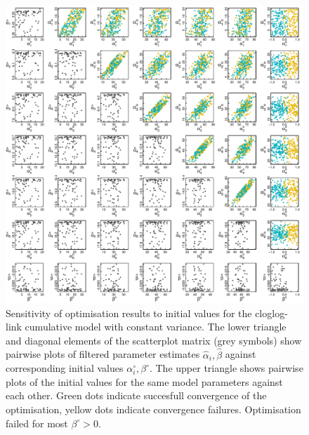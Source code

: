 \begin{figure}[p]
  \centering
  \includegraphics[width=\textwidth]{../figures/figS3_initial_value_sensitivity_cloglog.pdf}
  \caption{Sensitivity of optimisation results to initial values for the cloglog-link cumulative model with constant variance. The lower triangle and diagonal elements of the scatterplot matrix (grey symbols) show pairwise plots of filtered parameter estimates $\hat{\alpha}_i, \hat{\beta}$ against corresponding initial values $\alpha^{\circ}_i, \beta^{\circ}$. The upper triangle shows pairwise plots of the initial values for the same model parameters against each other. Green dots indicate succesfull convergence of the optimisation, yellow dots indicate convergence failures. Optimisation failed for most $\beta^{\circ}>0$.}
  \label{fig:figS3}
\end{figure} 